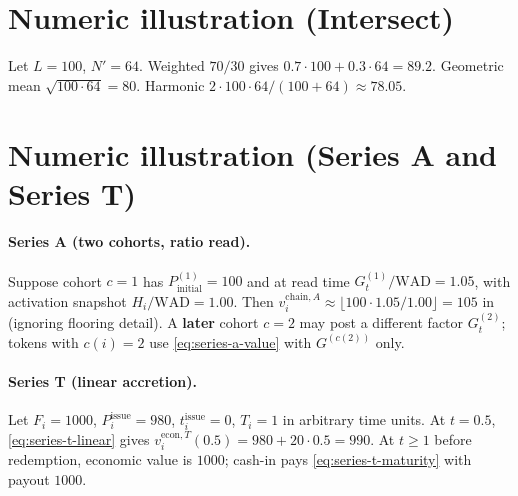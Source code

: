 \documentclass[11pt,a4paper]{article}
\newcommand{\WAD}{\mathrm{WAD}}
\newcommand{\minor}{\text{minor units}}
\begin{document}
\appendix

\section{Numeric illustration (Intersect)}

Let $L=100$, $N'=64$. Weighted $70/30$ gives $0.7\cdot 100 + 0.3\cdot 64 = 89.2$.
Geometric mean $\sqrt{100\cdot 64}=80$. Harmonic $2\cdot100\cdot64/(100+64)\approx 78.05$.

\begin{center}
\end{center}

\section{Numeric illustration (Series A and Series T)}

\paragraph{Series A (two cohorts, ratio read).}
Suppose cohort $c=1$ has $P^{(1)}_{\mathrm{initial}}=100$ and at read time $G^{(1)}_t / \WAD = 1.05$, with activation snapshot $H_i/\WAD = 1.00$. Then $v_i^{\mathrm{chain},A} \approx \lfloor 100 \cdot 1.05 / 1.00\rfloor = 105$ in \minor{} (ignoring flooring detail). A \textbf{later} cohort $c=2$ may post a different factor $G^{(2)}_t$; tokens with $c(i)=2$ use \eqref{eq:series-a-value} with $G^{(c(2))}$ only.

\paragraph{Series T (linear accretion).}
Let $F_i=1000$, $P^{\mathrm{issue}}_i=980$, $t^{\mathrm{issue}}_i=0$, $T_i=1$ in arbitrary time units. At $t=0.5$, \eqref{eq:series-t-linear} gives $v_i^{\mathrm{econ},T}(0.5) = 980 + 20 \cdot 0.5 = 990$. At $t \ge 1$ before redemption, economic value is $1000$; cash-in pays \eqref{eq:series-t-maturity} with payout $1000$.
\end{document}
